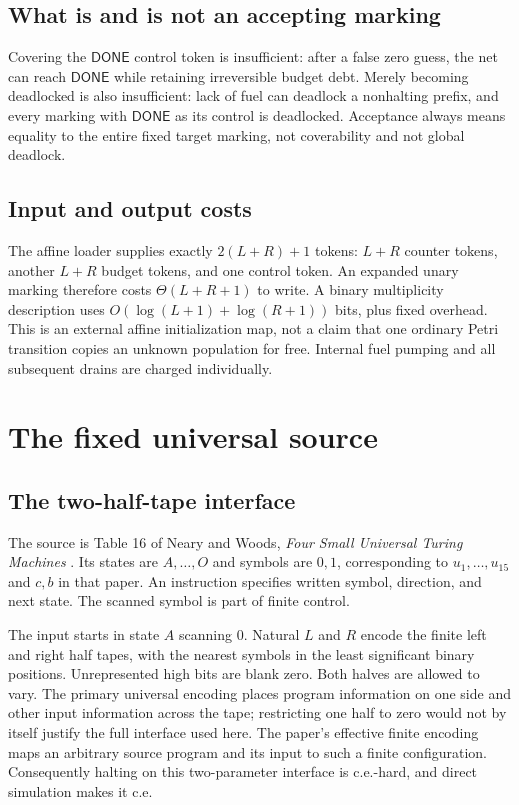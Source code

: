 \documentclass[11pt,letterpaper]{article}
\theoremstyle{definition}
\theoremstyle{remark}
\newcommand{\DONE}{\mathsf{DONE}}
\begin{document}
\subsection{What is and is not an accepting marking}
Covering the $\DONE$ control token is insufficient: after a false zero guess, the net can reach $\DONE$ while retaining irreversible budget debt. Merely becoming deadlocked is also insufficient: lack of fuel can deadlock a nonhalting prefix, and every marking with $\DONE$ as its control is deadlocked. Acceptance always means equality to the entire fixed target marking, not coverability and not global deadlock.

\subsection{Input and output costs}
The affine loader supplies exactly $2(L+R)+1$ tokens: $L+R$ counter tokens, another $L+R$ budget tokens, and one control token. An expanded unary marking therefore costs $\Theta(L+R+1)$ to write. A binary multiplicity description uses $O(\log(L+1)+\log(R+1))$ bits, plus fixed overhead. This is an external affine initialization map, not a claim that one ordinary Petri transition copies an unknown population for free. Internal fuel pumping and all subsequent drains are charged individually.

\section{The fixed universal source}
\label{qoc:rn:sec:source}
\subsection{The two-half-tape interface}
The source is Table 16 of Neary and Woods, \emph{Four Small Universal Turing Machines} \cite{rn:nw}. Its states are $A,\ldots,O$ and symbols are $0,1$, corresponding to $u_1,\ldots,u_{15}$ and $c,b$ in that paper. An instruction specifies written symbol, direction, and next state. The scanned symbol is part of finite control.

The input starts in state $A$ scanning $0$. Natural $L$ and $R$ encode the finite left and right half tapes, with the nearest symbols in the least significant binary positions. Unrepresented high bits are blank zero. Both halves are allowed to vary. The primary universal encoding places program information on one side and other input information across the tape; restricting one half to zero would not by itself justify the full interface used here. The paper's effective finite encoding maps an arbitrary source program and its input to such a finite configuration. Consequently halting on this two-parameter interface is c.e.-hard, and direct simulation makes it c.e.
\end{document}
